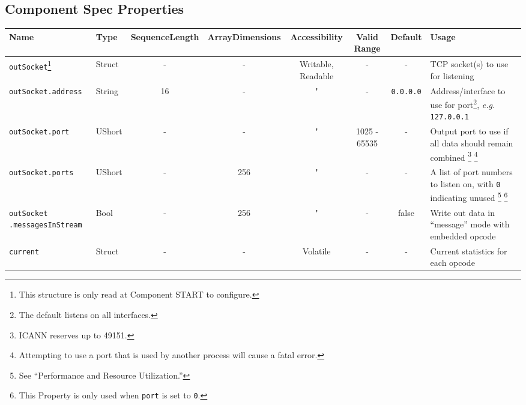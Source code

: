 \documentclass{article}
\begin{document}
\begin{landscape}
  \section*{Component Spec Properties}
  \begin{minipage}{\textwidth}
    \renewcommand*\footnoterule{} %
    \renewcommand{\thempfootnote}{\arabic{mpfootnote}} %
  \begin{scriptsize}
    \begin{tabular}{|p{3cm}|p{1.5cm}|c|c|c|c|c|p{7cm}|}
      \hline
      \rowcolor{blue}
      Name                          & Type      & SequenceLength & ArrayDimensions & Accessibility      & Valid Range & Default       & Usage \\
      \hline
      \verb+outSocket+\footnote{This structure is only read at Component START to configure.} & Struct & - & - & Writable, Readable & - & - & TCP socket(s) to use for listening \\
      \hline
      \verb+outSocket.address+      & String    & 16             & -               & "                  & -           & \verb+0.0.0.0+ & Address/interface to use for port\footnote{The default listens on all interfaces.}, \textit{e.g.} \verb+127.0.0.1+ \\
      \hline
      \verb+outSocket.port+         & UShort    & -              & -               & "                  & 1025 - 65535 & -            & Output port to use if all data should remain combined \footnote{ICANN reserves up to 49151.} \footnote{Attempting to use a port that is used by another process will cause a fatal error.} \\
      \hline
      \verb+outSocket.ports+        & UShort    & -              & 256             & "                  & -           & -             & A list of port numbers to listen on, with \verb+0+ indicating unused \footnote{See ``Performance and Resource Utilization.''} \footnote{This Property is only used when \texttt{port} is set to \texttt{0}.}\\
      \hline
      \verb+outSocket+ \verb+.messagesInStream+ & Bool & -       & 256             & "                  & -           & false         & Write out data in ``message'' mode with embedded opcode \\
      \hline
      \verb+current+                & Struct    & -              & -               & Volatile           & -           & -             & Current statistics for each opcode \\

\end{tabular}
\end{scriptsize}
\end{minipage}
\end{landscape}
\end{document}
